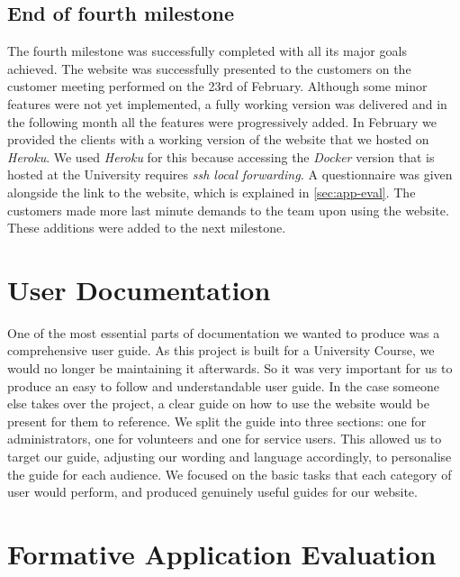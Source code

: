 \documentclass{l3proj}
\begin{document}

\subsection{End of fourth milestone}
\label{sec:milestone4}

The fourth milestone was successfully completed with all its major goals achieved. The website was successfully presented to the customers on the customer meeting performed on the 23rd of February. Although some minor features were not yet implemented, a fully working version was delivered and in the following month all the features were progressively added. In February we provided the clients with a working version of the website that we hosted on \textit{Heroku}. We used \textit{Heroku} for this because accessing the \textit{Docker} version that is hosted at the University requires \textit{ssh local forwarding.} A questionnaire was given alongside the link to the website, which is explained in \autoref{sec:app-eval}. The customers made more last minute demands to the team upon using the website. These additions were added to the next milestone.

\section{User Documentation}
\label{sec:user_doc}

One of the most essential parts of documentation we wanted to produce was a comprehensive user guide. As this project is built for a University Course, we would no longer be maintaining it afterwards. So it was very important for us to produce an easy to follow and understandable user guide. In the case someone else takes over the project, a clear guide on how to use the website would be present for them to reference. We split the guide into three sections: one for administrators, one for volunteers and one for service users. This allowed us to target our guide, adjusting our wording and language accordingly, to personalise the guide for each audience. We focused on the basic tasks that each category of user would perform, and produced genuinely useful guides for our website.

\section{Formative Application Evaluation}
\label{sec:app-eval}
\end{document}
